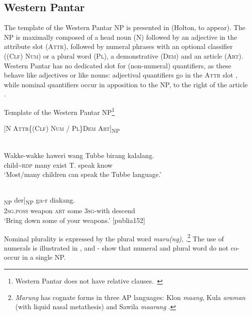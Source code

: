 \subsection{Western Pantar}  %
\label{sec:9:3.1}
The template of the Western Pantar NP is presented in  (Holton, to appear). The NP is maximally composed of a head noun (N) followed by an adjective in the attribute slot (\textsc{Attr),} followed by numeral phrases with an optional classifier (\textsc{(Clf)} \textsc{Num)} or a plural word (\textsc{Pl),} a demonstrative \textsc{(Dem)} and an article \textsc{(Art)}. Western Pantar has no dedicated slot for (non-numeral) quantifiers, as these behave like adjectives or like nouns: adjectival quantifiers go in the A\textsc{ttr} slot , while nominal quantifiers occur in apposition to the NP, to the right of the article .

\ea\label{ex:9:12}
Template of the Western Pantar NP\footnote{  Western Pantar does not have relative clauses.~}

 [\textsc{N  Attr\{(Clf) Num / Pl\}Dem  Art]}\textsc{\textsubscript{NP}}
 
\z


\ea%
\label{ex:9:13}
 \\
\gll  Wakke-wakke haweri wang Tubbe birang kalalang. \\
   child\~{}\textsc{rdp} many exist T. speak know  \\
\glt `Most/many children can speak the Tubbe language.'
\z







\ea%
\label{ex:9:14}
 \\
\gll [[{Hai} bloppa sing]\textsubscript{NP} {der}]\textsubscript{NP} ga-r diakang.  \\
  \textsc{2sg.poss} weapon \textsc{art} some 3\textsc{sg-}with descend  \\
\glt `Bring down some of your weapons.' [publia152]
\z






Nominal plurality is expressed by the plural word \textit{maru(ng)}, .\footnote{\textit{Marung}
 has cognate forms in three AP languages: Klon \textit{maang}, Kula \textit{araman} (with liquid nasal metathesis) and Sawila \textit{maarang} \citep{SchapperEtAlms}.
} The use of numerals is illustrated in , and - show that numeral and plural word do not co-occur in a single NP.



